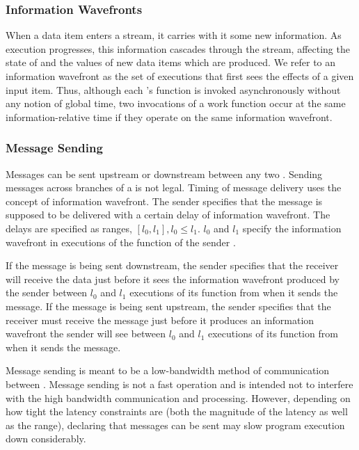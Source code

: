 \subsubsection{Information Wavefronts}

When a data item enters a stream, it carries with it some new
information. As execution progresses, this information cascades
through the stream, affecting the state of {\filters} and the values
of new data items which are produced. We refer to an information
wavefront as the set of {\filter} executions that first sees the
effects of a given input item. Thus, although each {\filter}'s {\work}
function is invoked asynchronously without any notion of global
time, two invocations of a work function occur at the same
information-relative time if they operate on the same information
wavefront.

\subsubsection{Message Sending}

Messages can be sent upstream or downstream between any two
{\filters}.  Sending messages across branches of a {\splitjoin} is not
legal.  Timing of message delivery uses the concept of information
wavefront.  The sender specifies that the message is supposed to
be delivered with a certain delay of information wavefront. The
delays are specified as ranges, $[l_0, l_1], l_0 \le l_1$. $l_0$
and $l_1$ specify the information wavefront in executions of the
{\work} function of the sender {\filter}.

If the message is being sent downstream, the sender specifies that
the receiver will receive the data just before it sees the
information wavefront produced by the sender between $l_0$ and
$l_1$ executions of its {\work} function from when it sends the
message. If the message is being sent upstream, the sender
specifies that the receiver must receive the message just before
it produces an information wavefront the sender will see between
$l_0$ and $l_1$ executions of its {\work} function from when it
sends the message.

Message sending is meant to be a low-bandwidth method of
communication between {\filters}. Message sending is not a fast
operation and is intended not to interfere with the high bandwidth
{\StreamIt} communication and processing.  However, depending on how
tight the latency constraints are (both the magnitude of the
latency as well as the range), declaring that messages can be sent
may slow program execution down considerably.

